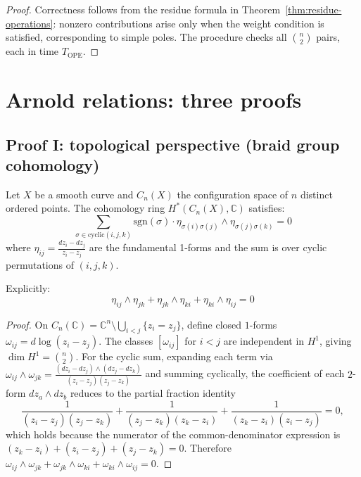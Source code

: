 \begin{proof}
Correctness follows from the residue formula in Theorem~\ref{thm:residue-operations}: nonzero contributions arise only when the weight condition is satisfied, corresponding to simple poles.  The procedure checks all $\binom{n}{2}$ pairs, each in time $T_{\mathrm{OPE}}$.
\end{proof}

\section{Arnold relations: three proofs}
\label{sec:arnold-three-proofs-comprehensive}
\label{sec:arnold-chiral}

\subsection{Proof I: topological perspective (braid group cohomology)}
\label{sec:arnold-proof-topological}

\begin{theorem}
\label{thm:arnold-topological}
Let $X$ be a smooth curve and $C_n(X)$ the configuration space of $n$ distinct ordered 
points. The cohomology ring $H^*(C_n(X), \mathbb{C})$ satisfies:
\begin{equation}
\sum_{\sigma \in \text{cyclic}(i,j,k)} \text{sgn}(\sigma) \cdot \eta_{\sigma(i)\sigma(j)} 
\wedge \eta_{\sigma(j)\sigma(k)} = 0
\end{equation}
where $\eta_{ij} = \frac{dz_i - dz_j}{z_i - z_j}$ are the fundamental 1-forms and the 
sum is over cyclic permutations of $(i,j,k)$.

Explicitly:
\begin{equation}
\eta_{ij} \wedge \eta_{jk} + \eta_{jk} \wedge \eta_{ki} + \eta_{ki} \wedge 
\eta_{ij} = 0
\end{equation}
\end{theorem}

\begin{proof}
On $C_n(\mathbb{C}) = \mathbb{C}^n \setminus \bigcup_{i<j}\{z_i = z_j\}$, define closed $1$-forms $\omega_{ij} = d\log(z_i - z_j)$.  The classes $[\omega_{ij}]$ for $i < j$ are independent in $H^1$, giving $\dim H^1 = \binom{n}{2}$.  For the cyclic sum, expanding each term via
$\omega_{ij} \wedge \omega_{jk} = \frac{(dz_i - dz_j)\wedge(dz_j - dz_k)}{(z_i - z_j)(z_j - z_k)}$
and summing cyclically, the coefficient of each $2$-form $dz_a \wedge dz_b$ reduces to the partial fraction identity
\[
\frac{1}{(z_i - z_j)(z_j - z_k)} + \frac{1}{(z_j - z_k)(z_k - z_i)} + \frac{1}{(z_k - z_i)(z_i - z_j)} = 0,
\]
which holds because the numerator of the common-denominator expression is $(z_k - z_i) + (z_i - z_j) + (z_j - z_k) = 0$.  Therefore $\omega_{ij} \wedge \omega_{jk} + \omega_{jk} \wedge \omega_{ki} + \omega_{ki} \wedge \omega_{ij} = 0$. \qedhere
\end{proof}

